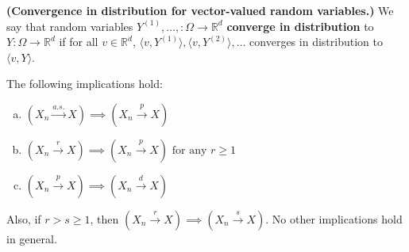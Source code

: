 \begin{definition} \textbf{(Convergence in distribution for vector-valued random variables.)} We say that random variables \(Y^{(1)}, \ldots, : \Omega \to \mathbb{R}^d\) \textbf{converge in distribution} to \(Y: \Omega \to \mathbb{R}^d\) if for all \(v \in \mathbb{R}^d\), \(\langle v, Y^{(1)} \rangle, \langle v, Y^{(2)} \rangle, \ldots\) converges in distribution to \(\langle v, Y \rangle\).

\end{definition}

\begin{theorem}\label{asym.convg.implications} The following implications hold:

\begin{enumerate}[(a)]

\item \( (X_n \xrightarrow{a.s.} X) \implies (X_n \xrightarrow{p} X) \)

\item \( (X_n \xrightarrow{r} X) \implies (X_n \xrightarrow{p} X) \text{ for any } r \geq 1 \)

\item \( (X_n \xrightarrow{p} X) \implies (X_n \xrightarrow{d} X) \)

\end{enumerate}

Also, if \(r > s \geq 1\), then \((X_n \xrightarrow{r} X) \implies (X_n \xrightarrow{s} X)\). No other implications hold in general.
\end{theorem}

